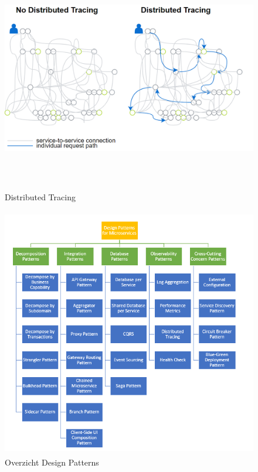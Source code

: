 \begin{figure}[!htb]
    \caption{Distributed Tracing}
    \centering
    \includegraphics[height=10cm]{DistributedTracing.png}
\end{figure}
\begin{figure}[!htb]
    \caption{Overzicht Design Patterns}
    \centering
    \includegraphics[height=11cm]{DesignPatterns.png}
\end{figure}
\newpage

